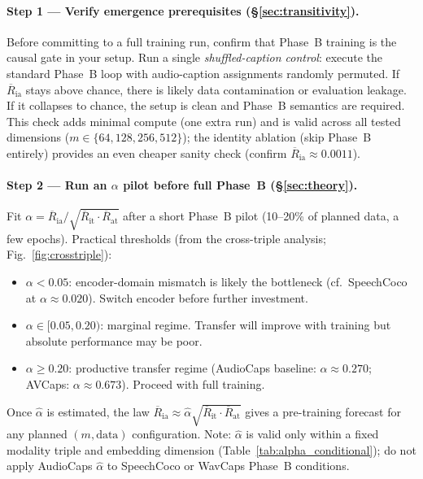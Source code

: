 \documentclass{article}
\newcommand{\avgR}{\overline{R}}
\begin{document}
\paragraph{Step 1 --- Verify emergence prerequisites (§\ref{sec:transitivity}).}
Before committing to a full training run, confirm that Phase~B training is the causal gate in
your setup.
Run a single \emph{shuffled-caption control}: execute the standard Phase~B loop with audio-caption
assignments randomly permuted.
If $\avgR_\mathrm{ia}$ stays above chance, there is likely data contamination or evaluation leakage.
If it collapses to chance, the setup is clean and Phase~B semantics are required.
This check adds minimal compute (one extra run) and is valid across all tested dimensions
($m \in \{64, 128, 256, 512\}$); the identity ablation (skip Phase~B entirely) provides an even cheaper
sanity check (confirm $\avgR_\mathrm{ia} \approx 0.0011$).

\paragraph{Step 2 --- Run an $\alpha$ pilot before full Phase~B (§\ref{sec:theory}).}
Fit $\alpha = \avgR_\mathrm{ia} / \sqrt{\avgR_\mathrm{it} \cdot \avgR_\mathrm{at}}$ after a
short Phase~B pilot (10--20\% of planned data, a few epochs).
Practical thresholds (from the cross-triple analysis; Fig.~\ref{fig:crosstriple}):
\begin{itemize}[topsep=2pt,itemsep=1pt,parsep=0pt]
  \item $\alpha < 0.05$: encoder-domain mismatch is likely the bottleneck (cf.\ SpeechCoco at
    $\alpha \approx 0.020$). Switch encoder before further investment.
  \item $\alpha \in [0.05, 0.20)$: marginal regime. Transfer will improve with training but
    absolute performance may be poor.
  \item $\alpha \geq 0.20$: productive transfer regime (AudioCaps baseline: $\alpha \approx 0.270$;
    AVCaps: $\alpha \approx 0.673$). Proceed with full training.
\end{itemize}
Once $\hat{\alpha}$ is estimated, the law $\avgR_\mathrm{ia} \approx \hat{\alpha}\sqrt{\avgR_\mathrm{it}\cdot\avgR_\mathrm{at}}$ gives a pre-training forecast for any planned $(m, \text{data})$ configuration.
Note: $\hat{\alpha}$ is valid only within a fixed modality triple and embedding dimension
(Table~\ref{tab:alpha_conditional}); do not apply AudioCaps $\hat{\alpha}$ to SpeechCoco or WavCaps Phase~B conditions.
\end{document}
